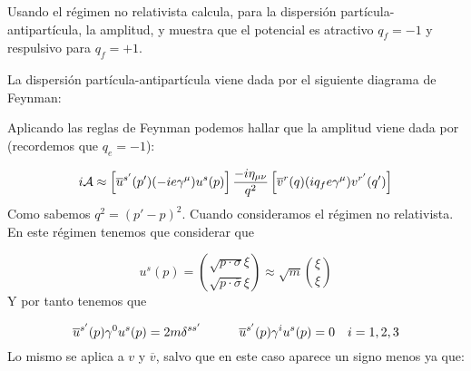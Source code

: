 \begin{ejercicio} 
	Usando el régimen no relativista calcula, para la dispersión partícula-antipartícula, la amplitud, y muestra que el potencial es atractivo $q_f=-1$ y respulsivo para $q_f=+1$.
\end{ejercicio}


\begin{solucion} 
	La dispersión partícula-antipartícula viene dada por el siguiente diagrama de Feynman:
	
	\begin{center}
	\end{center}
	Aplicando las reglas de Feynman podemos hallar que la amplitud viene dada por (recordemos que $q_e=-1$):
	
	\begin{equation*} 
		i \mathcal{A} \approx \left[  \overline{u}^{s'} (p')  (-ie\gamma^\mu) u^s (p)  \right] \frac{- i \eta_{\mu \nu}}{q^2} \left[   \overline{v}^r (q) (i q_fe\gamma^\mu)  v^{r'} (q')   \right]
	\end{equation*}
	Como sabemos $q^2 = (p'-p)^2$. Cuando consideramos el régimen no relativista. En este régimen tenemos que considerar que 
	
	\begin{equation*}
		u^s(p) = \binom{\sqrt{p \cdot \sigma} \xi }{\sqrt{p \cdot \overline{\sigma}} \xi } \approx \sqrt{m} \binom{\xi}{\xi}
 	\end{equation*}
 	Y por tanto tenemos que 
 	
 	\begin{equation*}
 		\overline{u}^{s'}(p) \gamma^0 u^s(p) = 2m \delta^{ss'}  \quad \quad \quad
 		\overline{u}^{s'}(p) \gamma^i u^s(p) = 0 \quad i=1,2,3
 	\end{equation*}
 	Lo mismo se aplica a $v$ y $\overline{v}$, salvo que en este caso aparece un signo menos ya que: 
 	

\end{solucion}
